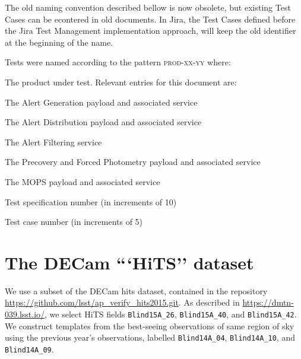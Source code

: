 \documentclass[DM,lsstdraft,STS,toc]{lsstdoc}
\begin{document}
The old naming convention described bellow is now obsolete, but existing Test Cases
can be econtered in old documents. In Jira, the Test Cases defined before the 
Jira Test Management implementation approach, will keep the old identifier
at the beginning of the name.

Tests were named according to the pattern \textsc{prod-xx-yy} where:

\begin{description}[font=\normalfont\scshape]

  \item[prod]{The product under test. Relevant entries for this document are:
    \begin{description}[font=\normalfont\scshape,topsep=-1.0ex]
      \item[AG]{The Alert Generation payload and associated service}
      \item[AD]{The Alert Distribution payload and associated service}
      \item[AF]{The Alert Filtering service}
      \item[PFP]{The Precovery and Forced Photometry payload and associated
	      service}
      \item[MOPS]{The MOPS payload and associated service}
    \end{description}
  }
  \item[xx]{Test specification number (in increments of 10)}
  \item[yy]{Test case number (in increments of 5)}

\end{description}

\newpage


\newpage


\newpage
\appendix



\newpage
\section{The DECam ```HiTS'' dataset}

We use a subset of the DECam hits dataset, contained in the repository
\url{https://github.com/lsst/ap\_verify\_hits2015.git}.  As described in
\url{https://dmtn-039.lsst.io/}, we select HiTS fields \texttt{Blind15A\_26},
\texttt{Blind15A\_40}, and \texttt{Blind15A\_42}. We construct templates from the best-seeing observations of
same region of sky using the previous year's observations, labelled
\texttt{Blind14A\_04}, \texttt{Blind14A\_10}, and \texttt{Blind14A\_09}.
\end{document}
